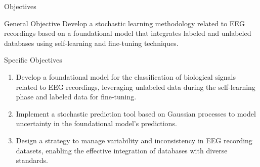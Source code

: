 \documentclass[spanish, aspectratio=169]{beamer}
\begin{document}
\begin{frame}{Objectives}
	\vspace{-0.3cm}
	\begin{block}{General Objective}
		\small
		Develop a stochastic learning methodology related to EEG recordings based on a foundational model that integrates labeled and unlabeled databases using self-learning and fine-tuning techniques.
	\end{block}
	
	\vspace{-0.1cm}
	\begin{block}{Specific Objectives}
		\small
		\begin{enumerate}
			\item Develop a foundational model for the classification of biological signals related to EEG recordings, leveraging \textcolor{MyAccent}{unlabeled data} during the self-learning phase and labeled data for fine-tuning.
			\item Implement a \textcolor{MyAccent}{stochastic prediction} tool based on Gaussian processes to model uncertainty in the foundational model's predictions.
			\item Design a strategy to \textcolor{MyAccent}{manage variability and inconsistency} in EEG recording datasets, enabling the effective integration of databases with diverse standards.
		\end{enumerate}
	\end{block}
\end{frame}
\end{document}

